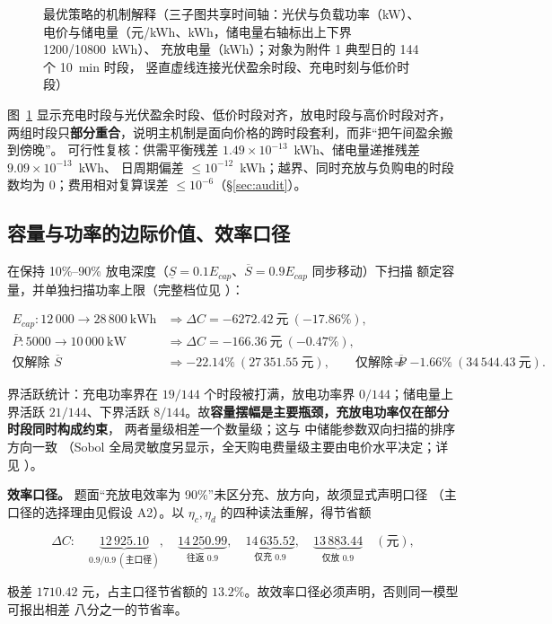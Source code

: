 \begin{figure}[htbp]
  \centering
  \caption{最优策略的机制解释（三子图共享时间轴：光伏与负载功率（\unit{kW}）、
            电价与储电量（\unit{元/kWh}、\unit{kWh}，储电量右轴标出上下界 1200/10800~\unit{kWh}）、
            充放电量（\unit{kWh}）；对象为附件 1 典型日的 144 个 10~\unit{min} 时段，
            竖直虚线连接光伏盈余时段、充电时刻与低价时段）}
  \label{fig:mechanism}
\end{figure}

图~\ref{fig:mechanism} 显示充电时段与光伏盈余时段、低价时段对齐，放电时段与高价时段对齐，
两组时段只\textbf{部分重合}，说明主机制是面向价格的跨时段套利，而非“把午间盈余搬到傍晚”。
可行性复核：供需平衡残差 \(1.49\times10^{-13}\)~kWh、储电量递推残差 \(9.09\times10^{-13}\)~kWh、
日周期偏差 \(\le10^{-12}\)~kWh；越界、同时充放与负购电的时段数均为 0；费用相对复算误差
\(\le10^{-6}\)（\S\ref{sec:audit}）。

\subsection{容量与功率的边际价值、效率口径}

在保持 10\%--90\% 放电深度（\(\underline S=0.1E_{cap}\)、\(\overline S=0.9E_{cap}\) 同步移动）下扫描
额定容量，并单独扫描功率上限（完整档位见 ）：

\begin{equation}
  \begin{aligned}
    E_{cap}:12\,000\to28\,800\ \text{kWh} &\Rightarrow \Delta C=-6272.42\ \text{元}\ (-17.86\%),\\
    \overline P:5000\to10\,000\ \text{kW} &\Rightarrow \Delta C=-166.36\ \text{元}\ (-0.47\%),\\
    \text{仅解除 }\overline S &\Rightarrow -22.14\%\ (27\,351.55\ \text{元}),\qquad
    \text{仅解除 }\overline P &\Rightarrow -1.66\%\ (34\,544.43\ \text{元}).
  \end{aligned}
  \label{eq:q1-scan}
\end{equation}

界活跃统计：充电功率界在 \(19/144\) 个时段被打满，放电功率界 \(0/144\)；储电量上界活跃
\(21/144\)、下界活跃 \(8/144\)。故\textbf{容量摆幅是主要瓶颈，充放电功率仅在部分时段同时构成约束}，
两者量级相差一个数量级；这与  中储能参数双向扫描的排序方向一致
（Sobol 全局灵敏度另显示，全天购电费量级主要由电价水平决定；详见
）。

\textbf{效率口径。} 题面“充放电效率为 90\%”未区分充、放方向，故须显式声明口径
（主口径的选择理由见假设 A2）。以 \(\eta_c,\eta_d\) 的四种读法重解，得节省额

\begin{equation}
  \Delta C:\quad
  \underbrace{12\,925.10}_{0.9/0.9\ (\text{主口径})},\quad
  \underbrace{14\,250.99}_{\text{往返 }0.9},\quad
  \underbrace{14\,635.52}_{\text{仅充 }0.9},\quad
  \underbrace{13\,883.44}_{\text{仅放 }0.9}\quad(\text{元}),
  \label{eq:q1-eff}
\end{equation}

极差 \(1710.42\) 元，占主口径节省额的 \(13.2\%\)。故效率口径必须声明，否则同一模型可报出相差
八分之一的节省率。
